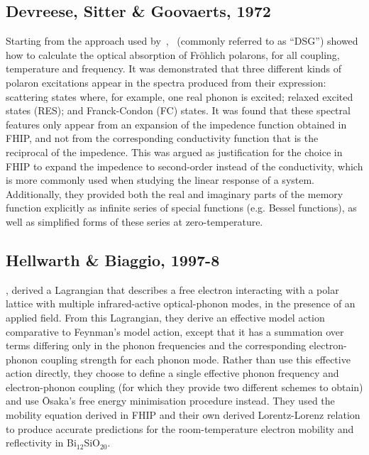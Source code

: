 \subsection{Devreese, Sitter \& Goovaerts, 1972}

Starting from the approach used by~\cite{feynman_mobility_1962},~\cite{devreese_optical_1972} (commonly referred to as ``DSG'') showed how to calculate the optical absorption of Fr\"ohlich polarons, for all coupling, temperature and frequency. It was demonstrated that three different kinds of polaron excitations appear in the spectra produced from their expression: scattering states where, for example, one real phonon is excited; relaxed excited states (RES); and Franck-Condon (FC) states. It was found that these spectral features only appear from an expansion of the impedence function obtained in FHIP, and not from the corresponding conductivity function that is the reciprocal of the impedence. This was argued as justification for the choice in FHIP to expand the impedence to second-order instead of the conductivity, which is more commonly used when studying the linear response of a system. Additionally, they provided both the real and imaginary parts of the memory function explicitly as infinite series of special functions (e.g. Bessel functions), as well as simplified forms of these series at zero-temperature.

\subsection{Hellwarth \& Biaggio, 1997-8}

\cite{hellwarth_mobility_1999}, derived a Lagrangian that describes a free electron interacting with a polar lattice with multiple infrared-active optical-phonon modes, in the presence of an applied field. From this Lagrangian, they derive an effective model action comparative to Feynman's model action, except that it has a summation over terms differing only in the phonon frequencies and the corresponding electron-phonon coupling strength for each phonon mode. Rather than use this effective action directly, they choose to define a single effective phonon frequency and electron-phonon coupling (for which they provide two different schemes to obtain) and use \=Osaka's free energy minimisation procedure instead. They used the mobility equation derived in FHIP and their own derived Lorentz-Lorenz relation to produce accurate predictions for the room-temperature electron mobility and reflectivity in Bi$_{12}$SiO$_{20}$.

